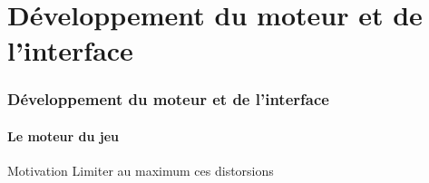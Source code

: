 \section{Développement du moteur et de l'interface}
	\begin{frame}
		\frametitle{Développement du moteur et de l'interface}
		\framesubtitle{Le moteur du jeu}
		\begin{block}{Motivation}
			Limiter au maximum ces distorsions
		\end{block}	
\end{frame}